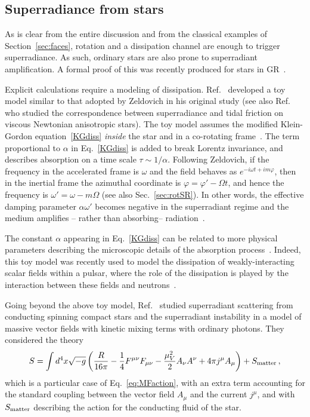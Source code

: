 \documentclass[11pt]{article}
\newcommand{\be}{\begin{equation}}
\newcommand{\ee}{\end{equation}}
\numberwithin{equation}{section} %
\begin{document}
\subsection{Superradiance from stars} \label{sec:SRNS}
As is clear from the entire discussion and from the classical examples of Section~\ref{sec:faces}, rotation and a 
dissipation channel are enough to trigger superradiance. As such, ordinary stars are also prone to superradiant 
amplification. A formal proof of this was recently produced for stars in GR~\cite{Richartz:2013unq}.

Explicit calculations require a modeling of dissipation. Ref.~\cite{Cardoso:2015zqa} developed a toy model similar to 
that adopted by Zeldovich in his original study (see also Ref.~\cite{Glampedakis:2013jya} who studied 
the correspondence between superradiance and tidal friction on viscous Newtonian anisotropic stars).
%
The toy model assumes the modified Klein-Gordon equation~\eqref{KGdiss} {\it inside} the star and in a co-rotating 
frame~\cite{zeldo1}. The term proportional to $\alpha$ in Eq.~\eqref{KGdiss} is added to break Lorentz invariance, and 
describes absorption on a time scale $\tau \sim 1/\alpha$. 
%
Following Zeldovich, if the frequency in the accelerated frame is $\omega$ and the field behaves as $e^{-i\omega 
t+im\varphi}$, then in the inertial frame the azimuthal coordinate is $\varphi=\varphi'-\Omega t$, and hence the 
frequency is $\omega'=\omega-m\Omega$ (see also Sec.~\ref{sec:rotSR}). In other words, the effective damping parameter 
$\alpha \omega'$ becomes negative in the superradiant regime and the medium amplifies -- rather than absorbing-- 
radiation~\cite{zeldovich1,zeldovich2}.


The constant $\alpha$ appearing in Eq.~\eqref{KGdiss} can be related to more physical 
parameters describing the microscopic details of the absorption process~\cite{Cardoso:2015zqa}. 
Indeed, this toy model was recently used to model the dissipation of weakly-interacting scalar fields within a pulsar, 
where the role of the dissipation is played by the interaction between these fields and neutrons~\cite{Kaplan:2019ako}.
%





Going beyond the above toy model, Ref.~\cite{Cardoso:2017kgn} studied superradiant scattering from conducting spinning 
compact stars and the superradiant instability in a model of massive vector fields with kinetic mixing terms with 
ordinary photons. They considered the theory
%
\be
S =\int d^4x \sqrt{-g} 
 \left( \frac{R}{16\pi} - \frac{1}{4}F^{\mu\nu}F_{\mu\nu} - \frac{\mu_V^2}{2}A_{\nu}A^{\nu}+4\pi  j^\mu 
A_\mu\right)+S_{\rm matter}\,,\label{action}
\ee
%
which is a particular case of Eq.~\eqref{eq:MFaction}, with an extra term accounting for the standard coupling between 
the vector field $A_\mu$ and the current $j^\mu$, and with $S_{\rm matter}$ describing the action for the conducting 
fluid of the star.
\end{document}
